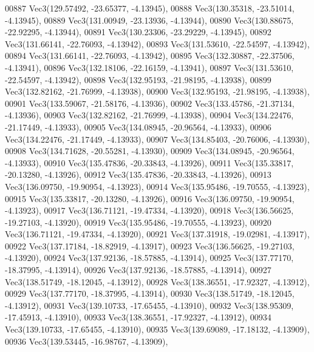\begin{DoxyCode}
00887         Vec3(129.57492, -23.65377, -4.13945),
00888         Vec3(130.35318, -23.51014, -4.13945),
00889         Vec3(131.00949, -23.13936, -4.13944),
00890         Vec3(130.88675, -22.92295, -4.13944),
00891         Vec3(130.23306, -23.29229, -4.13945),
00892         Vec3(131.66141, -22.76093, -4.13942),
00893         Vec3(131.53610, -22.54597, -4.13942),
00894         Vec3(131.66141, -22.76093, -4.13942),
00895         Vec3(132.30887, -22.37506, -4.13941),
00896         Vec3(132.18106, -22.16159, -4.13941),
00897         Vec3(131.53610, -22.54597, -4.13942),
00898         Vec3(132.95193, -21.98195, -4.13938),
00899         Vec3(132.82162, -21.76999, -4.13938),
00900         Vec3(132.95193, -21.98195, -4.13938),
00901         Vec3(133.59067, -21.58176, -4.13936),
00902         Vec3(133.45786, -21.37134, -4.13936),
00903         Vec3(132.82162, -21.76999, -4.13938),
00904         Vec3(134.22476, -21.17449, -4.13933),
00905         Vec3(134.08945, -20.96564, -4.13933),
00906         Vec3(134.22476, -21.17449, -4.13933),
00907         Vec3(134.85403, -20.76006, -4.13930),
00908         Vec3(134.71628, -20.55281, -4.13930),
00909         Vec3(134.08945, -20.96564, -4.13933),
00910         Vec3(135.47836, -20.33843, -4.13926),
00911         Vec3(135.33817, -20.13280, -4.13926),
00912         Vec3(135.47836, -20.33843, -4.13926),
00913         Vec3(136.09750, -19.90954, -4.13923),
00914         Vec3(135.95486, -19.70555, -4.13923),
00915         Vec3(135.33817, -20.13280, -4.13926),
00916         Vec3(136.09750, -19.90954, -4.13923),
00917         Vec3(136.71121, -19.47334, -4.13920),
00918         Vec3(136.56625, -19.27103, -4.13920),
00919         Vec3(135.95486, -19.70555, -4.13923),
00920         Vec3(136.71121, -19.47334, -4.13920),
00921         Vec3(137.31918, -19.02981, -4.13917),
00922         Vec3(137.17184, -18.82919, -4.13917),
00923         Vec3(136.56625, -19.27103, -4.13920),
00924         Vec3(137.92136, -18.57885, -4.13914),
00925         Vec3(137.77170, -18.37995, -4.13914),
00926         Vec3(137.92136, -18.57885, -4.13914),
00927         Vec3(138.51749, -18.12045, -4.13912),
00928         Vec3(138.36551, -17.92327, -4.13912),
00929         Vec3(137.77170, -18.37995, -4.13914),
00930         Vec3(138.51749, -18.12045, -4.13912),
00931         Vec3(139.10733, -17.65455, -4.13910),
00932         Vec3(138.95309, -17.45913, -4.13910),
00933         Vec3(138.36551, -17.92327, -4.13912),
00934         Vec3(139.10733, -17.65455, -4.13910),
00935         Vec3(139.69089, -17.18132, -4.13909),
00936         Vec3(139.53445, -16.98767, -4.13909),

\end{DoxyCode}
